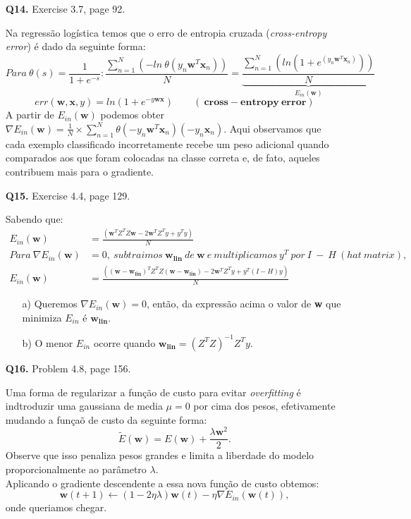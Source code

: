 \documentclass[12pt]{article}
\begin{document}
\begin{enumerate}
\begin{addmargin}[1em]{2em}
\begin{itemize}
		\end{itemize}
	\end{addmargin}
\item [\textbf{Q14.}] Exercise 3.7, page 92.
	\begin{addmargin}[1em]{2em}
		Na regressão logística temos que o erro de entropia cruzada (\textit{cross-entropy error}) é dado da seguinte forma: \[Para\ \theta(s) = \frac{1}{1 + e^{-s}}: \frac{\sum_{n=1}^{N}(-ln\ \theta(y_n \mathbf{w}^T \mathbf{x}_n))}{N} = \underbrace{\frac{\sum_{n=1}^{N}(ln(1 + e^{(y_n \mathbf{w}^T \mathbf{x}_n)}))}{N}}_\textit{$E_{in}(\mathbf{w})$}\]
		\[err(\mathbf{w}, \mathbf{x}, y) = ln(1 + e^{-y\mathbf{w}\mathbf{x}}) \qquad \mathbf{(\ cross-entropy\ error)} \]
		A partir de $E_{in}(\mathbf{w})$ podemos obter $\nabla E_{in}(\mathbf{w}) = \frac{1}{N} \times \sum_{n=1}^{N}\theta(-y_n \mathbf{w}^T \mathbf{x}_n) (-y_n\mathbf{x}_n)$. Aqui observamos que cada exemplo classificado incorretamente recebe um peso adicional quando comparados aos que  foram colocadas na classe correta e, de fato, aqueles contribuem mais para o gradiente.
	\end{addmargin}
\item [\textbf{Q15.}] Exercise 4.4, page 129.
	\begin{addmargin}[1em]{2em}
		Sabendo que:
		\begin{align*}
			E_{in}(\mathbf{w}) & = \frac{(\mathbf{w}^TZ^TZ\mathbf{w} - 2 \mathbf{w}^TZ^Ty + y^Ty)}{N}\\
			Para\ \nabla E_{in}(\mathbf{w}) & = 0,\ subtraimos\ \mathbf{w_{lin}}\ de\ \mathbf{w}\ e\ multiplicamos\ y^T\ por\ I\ -\ H\ (hat\ matrix),\\
			E_{in}(\mathbf{w}) & = \frac{((\mathbf{w - w_{lin}})^TZ^TZ(\mathbf{w - w_{lin}}) - 2 \mathbf{w}^TZ^Ty + y^T(I - H)y)}{N}
		\end{align*}
		\begin{itemize}
			\item[a)] Queremos $\nabla E_{in}(\mathbf{w}) = 0$, então, da expressão acima o valor de \textbf{w} que minimiza $E_{in}$ é $\mathbf{w_{lin}}$.
			\item[b)] O menor $E_{in}$ ocorre quando $\mathbf{w_{lin}} = (Z^TZ)^{-1}Z^Ty$.
		\end{itemize}
	\end{addmargin}
\item [\textbf{Q16.}] Problem 4.8, page 156.
	\begin{addmargin}[1em]{2em}
		Uma forma de regularizar a função de custo para evitar \textit{overfitting} é indtroduzir uma gaussiana de media $\mu = 0$ por cima dos pesos, efetivamente mudando a funçaõ de custo da seguinte forma: \[\tilde{E}(\mathbf{w}) = E(\mathbf{w}) + \frac{\lambda \mathbf{w}^2}{2}.\]
		Observe que isso penaliza pesos grandes e limita a liberdade do modelo proporcionalmente ao parâmetro $\lambda$.\\
		Aplicando o gradiente descendente a essa nova função de custo obtemos: \[\mathbf{w}(t+1) \leftarrow (1-2\eta \lambda)\mathbf{w}(t) - \eta \nabla E_{in}(\mathbf{w}(t)),\]
		onde queriamos chegar.
	\end{addmargin}


\end{enumerate}
\end{document}

